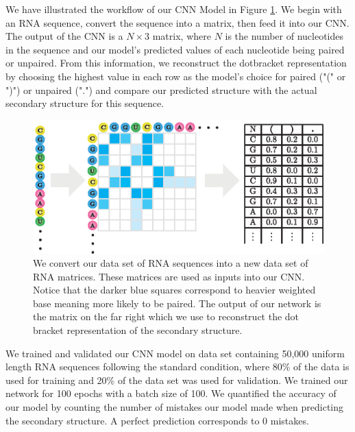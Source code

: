 \documentclass[11pt]{article}
\begin{document}
\begin{multicols}{2}
We have illustrated the workflow of our CNN Model in Figure \ref{fig:cnn_model}. We begin with an RNA sequence, convert the sequence into a matrix, then feed it into our CNN. The output of the CNN is a $N \times 3$ matrix, where $N$ is the number of nucleotides in the sequence and our model's predicted values of each nucleotide being paired or unpaired. From this information, we reconstruct the dotbracket representation by choosing the highest value in each row as the model's choice for paired ("(" or ")") or unpaired (".") and compare our predicted structure with the actual secondary structure for this sequence.
\end{multicols}

\begin{figure}[H]
\centering
\hspace*{-8cm}\includegraphics{fig/cnn_model_outline}
\caption{We convert our data set of RNA sequences into a new data set of RNA matrices. These matrices are used as inputs into our CNN. Notice that the darker blue squares correspond to heavier weighted base meaning more likely to be paired. The output of our network is the matrix on the far right which we use to reconstruct the dot bracket representation of the secondary structure.}
\label{fig:cnn_model}
\end{figure}

\begin{multicols}{2}
We trained and validated our CNN model on data set containing 50,000 uniform length RNA sequences following the standard condition, where 80\% of the data is used for training and 20\% of the data set was used for validation. We trained our network for 100 epochs with a batch size of 100. We quantified the accuracy of our model by counting the number of mistakes our model made when predicting the secondary structure. A perfect prediction corresponds to 0 mistakes.
\end{multicols}
\end{document}
